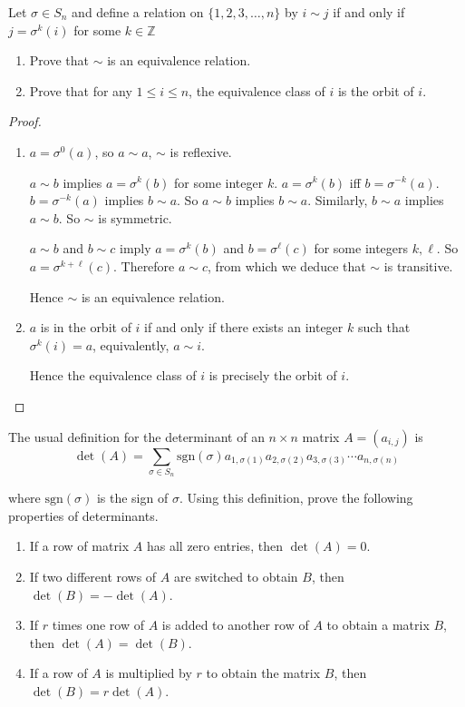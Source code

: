 \begin{exercise}
    Let $\sigma\in S_{n}$ and define a relation on $\{ 1, 2, 3, \ldots, n \}$ by $i\sim j$ if and only if $j = \sigma^{k}(i)$ for some $k\in\mathbb{Z}$
    \begin{enumerate}[label={\textbf{\arabic*.}}]
        \item Prove that $\sim$ is an equivalence relation.
        \item Prove that for any $1\leq i\leq n$, the equivalence class of $i$ is the orbit of $i$.
    \end{enumerate}
\end{exercise}

\begin{proof}
    \begin{enumerate}[label={\textbf{\arabic*.}}]
        \item $a = \sigma^{0}(a)$, so $a\sim a$, $\sim$ is reflexive.

              $a\sim b$ implies $a = \sigma^{k}(b)$ for some integer $k$. $a = \sigma^{k}(b)$ iff $b = \sigma^{-k}(a)$. $b = \sigma^{-k}(a)$ implies $b\sim a$. So $a\sim b$ implies $b\sim a$. Similarly, $b\sim a$ implies $a\sim b$. So $\sim$ is symmetric.

              $a\sim b$ and $b\sim c$ imply $a = \sigma^{k}(b)$ and $b = \sigma^{\ell}(c)$ for some integers $k, \ell$. So $a = \sigma^{k+\ell}(c)$. Therefore $a\sim c$, from which we deduce that $\sim$ is transitive.

              Hence $\sim$ is an equivalence relation.
        \item $a$ is in the orbit of $i$ if and only if there exists an integer $k$ such that $\sigma^{k}(i) = a$, equivalently, $a\sim i$.

              Hence the equivalence class of $i$ is precisely the orbit of $i$.
    \end{enumerate}
\end{proof}

\begin{exercise}
    The usual definition for the determinant of an $n\times n$ matrix $A = {(a_{i,j})}$ is
    \[
        \det(A) = \sum_{\sigma\in S_{n}}\text{sgn}(\sigma)a_{1,\sigma(1)}a_{2,\sigma(2)}a_{3,\sigma(3)}\cdots a_{n,\sigma(n)}
    \]

    where $\text{sgn}(\sigma)$ is the sign of $\sigma$. Using this definition, prove the following properties of determinants.
    \begin{enumerate}[label={\textbf{\alph*.}}]
        \item If a row of matrix $A$ has all zero entries, then $\det(A) = 0$.
        \item If two different rows of $A$ are switched to obtain $B$, then $\det(B) = -\det(A)$.
        \item If $r$ times one row of $A$ is added to another row of $A$ to obtain a matrix $B$, then $\det(A) = \det(B)$.
        \item If a row of $A$ is multiplied by $r$ to obtain the matrix $B$, then $\det(B) = r\det(A)$.
    \end{enumerate}
\end{exercise}

